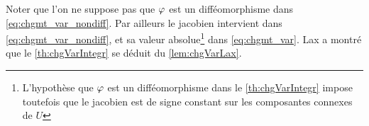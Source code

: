 %

\begin{remark}
\label{rem:chgVarDiffeo}
Noter que l'on ne suppose pas que $\varphi$ est un difféomorphisme dans \eqref{eq:chgmt_var_nondiff}. Par ailleurs le jacobien intervient dans \eqref{eq:chgmt_var_nondiff}, et sa valeur absolue\footnote{L'hypothèse que $\varphi$ est un difféomorphisme dans le \cref{th:chgVarIntegr} impose toutefois que le jacobien est de signe constant sur les composantes connexes de $U$} dans \eqref{eq:chgmt_var}.
	Lax a montré que le \cref{th:chgVarIntegr} se déduit du \cref{lem:chgVarLax}.
\end{remark}



